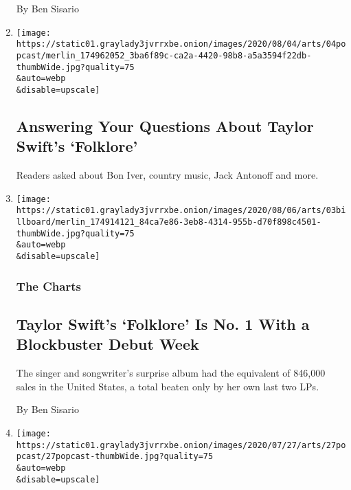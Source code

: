 \begin{enumerate}
  By Ben Sisario
\item
  \href{/2020/08/04/arts/music/taylor-swift-folklore-questions.html}{}

  \texttt{[image: https://static01.graylady3jvrrxbe.onion/images/2020/08/04/arts/04popcast/merlin\_174962052\_3ba6f89c-ca2a-4420-98b8-a5a3594f22db-thumbWide.jpg?quality=75\\\&auto=webp\\\&disable=upscale]}

  \hypertarget{answering-your-questions-about-taylor-swifts-folklore}{%
  \subsection{Answering Your Questions About Taylor Swift's
  `Folklore'}\label{answering-your-questions-about-taylor-swifts-folklore}}

  Readers asked about Bon Iver, country music, Jack Antonoff and more.
\item
  \href{/2020/08/03/arts/music/taylor-swift-folklore-billboard-chart.html}{}

  \texttt{[image: https://static01.graylady3jvrrxbe.onion/images/2020/08/06/arts/03billboard/merlin\_174914121\_84ca7e86-3eb8-4314-955b-d70f898c4501-thumbWide.jpg?quality=75\\\&auto=webp\\\&disable=upscale]}

  \hypertarget{the-charts-2}{%
  \subsubsection{The Charts}\label{the-charts-2}}

  \hypertarget{taylor-swifts-folklore-is-no-1-with-a-blockbuster-debut-week}{%
  \subsection{Taylor Swift's `Folklore' Is No. 1 With a Blockbuster
  Debut
  Week}\label{taylor-swifts-folklore-is-no-1-with-a-blockbuster-debut-week}}

  The singer and songwriter's surprise album had the equivalent of
  846,000 sales in the United States, a total beaten only by her own
  last two LPs.

  By Ben Sisario
\item
  \href{/2020/07/27/arts/music/popcast-taylor-swift-folklore.html}{}

  \texttt{[image: https://static01.graylady3jvrrxbe.onion/images/2020/07/27/arts/27popcast/27popcast-thumbWide.jpg?quality=75\\\&auto=webp\\\&disable=upscale]}

  \hypertarget{taylor-swifts-folklore-lets-discuss}{%
}
\end{enumerate}

